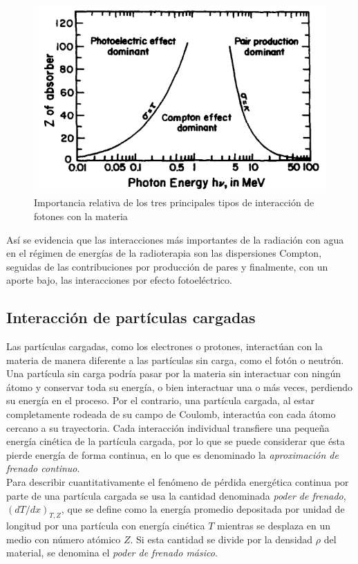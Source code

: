 \begin{figure}[H]
	\centering
	\includegraphics[width=0.7\linewidth]{images/importanciaRelativa.png}
	\caption{Importancia relativa de los tres principales tipos de interacción de fotones con la materia \cite{Attix1986}}
	\label{fig:importanciaRelativa}
\end{figure}

Así se evidencia que las interacciones más importantes de la radiación con agua en el régimen de energías de la radioterapia son las dispersiones Compton, seguidas de las contribuciones por producción de pares y finalmente, con un aporte bajo, las interacciones por efecto fotoeléctrico.  \\

\subsection{Interacción de partículas cargadas}

Las partículas cargadas, como los electrones o protones, interactúan con la materia de manera diferente a las partículas sin carga, como el fotón o neutrón. Una partícula sin carga podría pasar por la materia sin interactuar con ningún átomo y conservar toda su energía, o bien interactuar una o más veces, perdiendo su energía en el proceso. Por el contrario, una partícula cargada, al estar completamente rodeada de su campo de Coulomb, interactúa con cada átomo cercano a su trayectoria. Cada interacción individual transfiere una pequeña energía cinética de la partícula cargada, por lo que se puede considerar que ésta pierde energía de forma continua, en lo que es denominado la \textit{aproximación de frenado continuo}\cite{Attix1986}.\\

Para describir cuantitativamente el fenómeno de pérdida energética continua por parte de una partícula cargada se usa la cantidad denominada \textit{poder de frenado}, $(dT/dx)_{T,Z}$, que se define como la energía promedio depositada por unidad de longitud por una partícula con energía cinética $T$ mientras se desplaza en un medio con número atómico $Z$. Si esta cantidad se divide por la densidad $\rho$ del material, se denomina el \textit{poder de frenado másico}.\\

